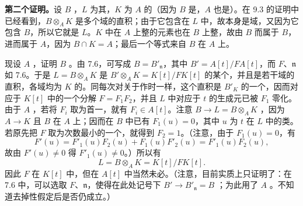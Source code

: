 \textbf{第二个证明。}设 $B$ ，$L$ 为其，$K$ 为 $A$ 的（因为 $B$ 是，$A$ 也是）。在 9.3 的证明中已经看到，$B\otimes_A K$ 是多个域的直积；由于它包含在 $L$ 中，故本身是域，又因为它包含 $B$，所以它就是 $L$。$K$ 中在 $A$ 上整的元素也在 $B$ 上整，故由 $B$ 而属于 $B$，进而属于 $A$，因为 $B\cap K=A$；最后一个等式来自 $B$ 在 $A$ 上。

现设 $A$ ，证明 $B$ 。由 7.6，可写成 $B=B'_{\mathfrak n}$，其中 $B'=A[t]/FA[t]$，而 $F$、$\mathfrak n$ 如 7.6。于是 $L=B\otimes_A K$ 是 $B'\otimes_A K=K[t]/FK[t]$ 的某个，并且是若干域的直积，各域均为 $K$ 的。同每次对关于作时一样，这个直积是 $B'_K$ 的一个，因而对应于 $K[t]$ 中的一个分解 $F=F_1F_2$，并且 $L$ 中对应于 $t$ 的生成元已被 $F_1$ 零化。由于 $A$ ，若将 $F_i$ 取为首一，就有 $F_i\in A[t]$。注意 $B\to L=B\otimes_A K$ ，因为 $A\to K$ 且 $B$ 在 $A$ 上；因而在 $B$ 中已有 $F_1(u)=0$，其中 $u$ 为 $t$ 在 $L$ 中的类。若原先把 $F$ 取为次数最小的一个，就得到 $F_2=1$。（注意，由于 $F_1(u)=0$，有
\[
 F'(u)=F'_1(u)F_2(u)+F_1(u)F'_2(u)=F'_1(u)F_2(u),
\]
故由 $F'(u)\neq0$ 得 $F'_1(u)\neq0$。）所以有
\[
 L=B\otimes_A K=K[t]/FK[t].\tag{$*$}
\]
因此 $F$ 在 $K[t]$ 中，但在 $A[t]$ 中当然未必。（注意，目前实质上只证明了：在 7.6 中，可以选取 $F$、$\mathfrak n$，使得在此处记号下 $B'\to B'_{\mathfrak n}=B$ ；为此用了 $A$ 。不知道去掉性假定后是否仍成立。）

